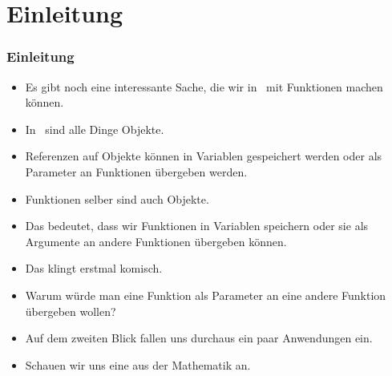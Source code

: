\documentclass[aspectratio=169,mathserif,notheorems]{beamer}%
\subtitle{30.~Funktionen als Parameter, \mbox{\texttt{Callable}s und \texttt{lambda}s}}%
\begin{document}
%
%
\startPresentation%
%
\section{Einleitung}%
\begin{frame}[t]%
\frametitle{Einleitung}%
\begin{itemize}%
%
%
%
%
%
%
%
%
\item<5-> Es gibt noch eine interessante Sache, die wir in \python\ mit Funktionen machen können.%
%
\item<6-> In \python\ sind alle Dinge Objekte\cite{H2025PM:EIAO,PSF:P3D:TPLR:DM}.%
%
\item<7-> Referenzen auf Objekte können in Variablen gespeichert werden oder als Parameter an Funktionen übergeben werden.%
%
\item<8-> Funktionen selber sind auch Objekte\cite{PSF:P3D:TPLR:DM}.%
%
\item<9-> Das bedeutet, dass wir Funktionen in Variablen speichern oder sie als Argumente an andere Funktionen übergeben können.%
%
\item<10-> Das klingt erstmal komisch.%
%
\item<11-> Warum würde man eine Funktion als Parameter an eine andere Funktion übergeben wollen?%
%
\item<12-> Auf dem zweiten Blick fallen uns durchaus ein paar Anwendungen ein.%
%
\item<13-> Schauen wir uns eine aus der Mathematik an.%
\end{itemize}%
\end{frame}%
%
\end{document}
